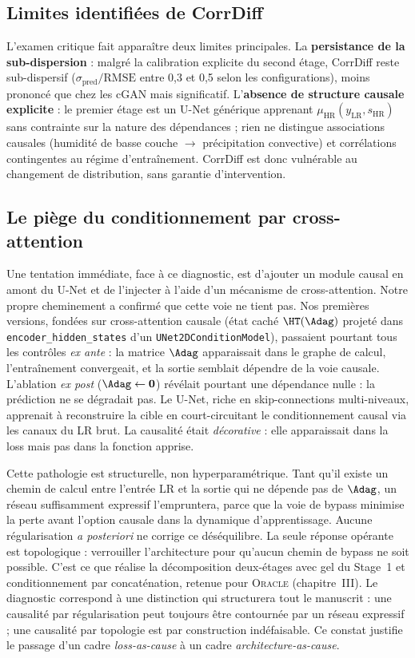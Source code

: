 \documentclass[14pt,a4paper,openany]{extreport}
\newcommand{\Oracle}{\textsc{Oracle}}
\newcommand{\LR}{\ensuremath{\text{LR}}}
\newcommand{\HR}{\ensuremath{\text{HR}}}
\newcommand{\yLR}{\ensuremath{y_{\LR}}}
\newcommand{\muHR}{\ensuremath{\mu_{\HR}}}
\begin{document}
\subsection{Limites identifiées de CorrDiff}
\label{ssec:soa-corrdiff-limites}

L'examen critique fait apparaître deux limites principales. La \textbf{persistance de la sub-dispersion} : malgré la calibration explicite du second étage, CorrDiff reste sub-dispersif ($\sigma_{\mathrm{pred}}/\mathrm{RMSE}$ entre 0,3 et 0,5 selon les configurations), moins prononcé que chez les cGAN mais significatif. L'\textbf{absence de structure causale explicite} : le premier étage est un U-Net générique apprenant $\muHR(\yLR, s_{\HR})$ sans contrainte sur la nature des dépendances ; rien ne distingue associations causales (humidité de basse couche $\to$ précipitation convective) et corrélations contingentes au régime d'entraînement. CorrDiff est donc vulnérable au changement de distribution, sans garantie d'intervention.

\subsection{Le piège du conditionnement par cross-attention}
\label{ssec:soa-corrdiff-bypass}

Une tentation immédiate, face à ce diagnostic, est d'ajouter un module causal en amont du U-Net et de l'injecter à l'aide d'un mécanisme de cross-attention. Notre propre cheminement a confirmé que cette voie ne tient pas. Nos premières versions, fondées sur cross-attention causale (état caché $\HT(\Adag)$ projeté dans \texttt{encoder\_hidden\_states} d'un \texttt{UNet2DConditionModel}), passaient pourtant tous les contrôles \emph{ex ante} : la matrice $\Adag$ apparaissait dans le graphe de calcul, l'entraînement convergeait, et la sortie semblait dépendre de la voie causale. L'ablation \emph{ex post} ($\Adag \leftarrow \mathbf{0}$) révélait pourtant une dépendance nulle : la prédiction ne se dégradait pas. Le U-Net, riche en skip-connections multi-niveaux, apprenait à reconstruire la cible en court-circuitant le conditionnement causal via les canaux du LR brut. La causalité était \emph{décorative} : elle apparaissait dans la loss mais pas dans la fonction apprise.

Cette pathologie est structurelle, non hyperparamétrique. Tant qu'il existe un chemin de calcul entre l'entrée \LR{} et la sortie qui ne dépende pas de $\Adag$, un réseau suffisamment expressif l'empruntera, parce que la voie de bypass minimise la perte avant l'option causale dans la dynamique d'apprentissage. Aucune régularisation \emph{a posteriori} ne corrige ce déséquilibre. La seule réponse opérante est topologique : verrouiller l'architecture pour qu'aucun chemin de bypass ne soit possible. C'est ce que réalise la décomposition deux-étages avec gel du Stage~1 et conditionnement par concaténation, retenue pour \Oracle{} (chapitre~III). Le diagnostic correspond à une distinction qui structurera tout le manuscrit : une causalité par régularisation peut toujours être contournée par un réseau expressif ; une causalité par topologie est par construction indéfaisable. Ce constat justifie le passage d'un cadre \emph{loss-as-cause} à un cadre \emph{architecture-as-cause}.
\end{document}
